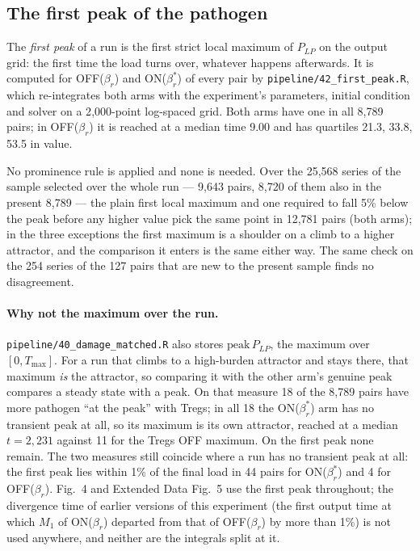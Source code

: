 \documentclass[11pt]{article}
\begin{document}
\subsection{The first peak of the pathogen}
\label{sec:first_peak}

The \emph{first peak} of a run is the first strict local maximum of $P_{LP}$ on the output grid:
the first time the load turns over, whatever happens afterwards. It is computed for OFF($\beta_r$)
and ON($\beta_r^{*}$) of every pair by \texttt{pipeline/42\_first\_peak.R}, which re-integrates both
arms with the experiment's parameters, initial condition and solver on a 2{,}000-point log-spaced
grid. Both arms have one in all 8{,}789 pairs; in OFF($\beta_r$) it is reached at a median time
9.00 and has quartiles 21.3, 33.8, 53.5 in value.

No prominence rule is applied and none is needed. Over the 25{,}568 series of the sample selected
over the whole run --- 9{,}643 pairs, 8{,}720 of them also in the present 8{,}789 --- the plain
first local maximum and one required to fall 5\% below the peak before any higher value pick the
same point in 12{,}781 pairs (both arms); in the three exceptions the first maximum is a shoulder
on a climb to a higher attractor, and the comparison it enters is the same either way. The same
check on the 254 series of the 127 pairs that are new to the present sample finds no
disagreement.

\paragraph{Why not the maximum over the run.} \texttt{pipeline/40\_damage\_matched.R} also stores
$\mathrm{peak}\,P_{LP}$, the maximum over $[0, T_{\max}]$. For a run that climbs to a high-burden
attractor and stays there, that maximum \emph{is} the attractor, so comparing it with the other
arm's genuine peak compares a steady state with a peak. On that measure 18 of the 8{,}789 pairs
have more pathogen ``at the peak'' with Tregs; in all 18 the ON($\beta_r^{*}$) arm has no transient
peak at all, so its maximum is its own attractor, reached at a median $t = 2{,}231$ against 11 for
the Tregs OFF maximum. On the first peak none remain. The two measures still coincide where a run
has no transient peak at all: the first peak lies within 1\% of the final load in 44 pairs for
ON($\beta_r^{*}$) and 4 for OFF($\beta_r$).
Fig.~4 and Extended Data Fig.~5 use the first peak throughout; the divergence time of earlier versions of this
experiment (the first output time at which $M_1$ of ON($\beta_r$) departed from that of
OFF($\beta_r$) by more than 1\%) is not used anywhere, and neither are the integrals split at it.
\end{document}
